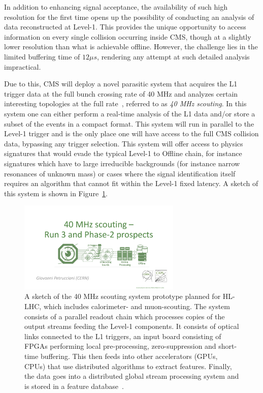 \documentclass[12pt]{iopart}
\begin{document}
In addition to enhancing signal acceptance, the availability of such high resolution for the first time opens up the possibility of conducting an analysis of data reconstructed at Level-1. This provides the unique opportunity to access information on every single collision occurring inside CMS, though at a slightly lower resolution than what is achievable offline. However, the challenge lies in the limited buffering time of $12\mu s$, rendering any attempt at such detailed analysis impractical.

Due to this, CMS will deploy a novel parasitic system that acquires the L1 trigger data at the full bunch crossing rate of 40 MHz and analyzes certain interesting topologies at the full rate~\cite{40MhzSc}, referred to as \textit{40 MHz scouting}. In this system one can either perform a real-time analysis of the L1 data and/or store a subset of the events in a compact format. This system will run in parallel to the Level-1 trigger and is the only place one will have access to the full CMS collision data, bypassing any trigger selection. This system will offer access to physics signatures that would evade the typical Level-1 to Offline chain, for instance signatures which have to large irreducible backgrounds (for instance narrow resonances of unknown mass) or cases where the signal identification itself requires an algorithm that cannot fit within the Level-1 fixed latency.
A sketch of this system is shown in Figure~\ref{fig:scouting}.
\begin{figure}[htb!]
    \centering
    \includegraphics[width=0.69\textwidth]{figures/40mhz_scout.pdf}
    \caption{A sketch of the 40 MHz scouting system prototype planned for HL-LHC, which includes calorimeter- and muon-scouting. The system consists of a parallel readout chain which processes copies of the output streams feeding the Level-1 components. It consists of optical links connected to the L1 triggers, an input board consisting of FPGAs performing local pre-processing, zero-suppression and short-time buffering. This then feeds into other accelerators (GPUs, CPUs) that use distributed algorithms to extract features. Finally, the data goes into a distributed global stream processing system and is stored in a feature database~\cite{tdr}.
    }
    \label{fig:scouting}
\end{figure}
\end{document}
